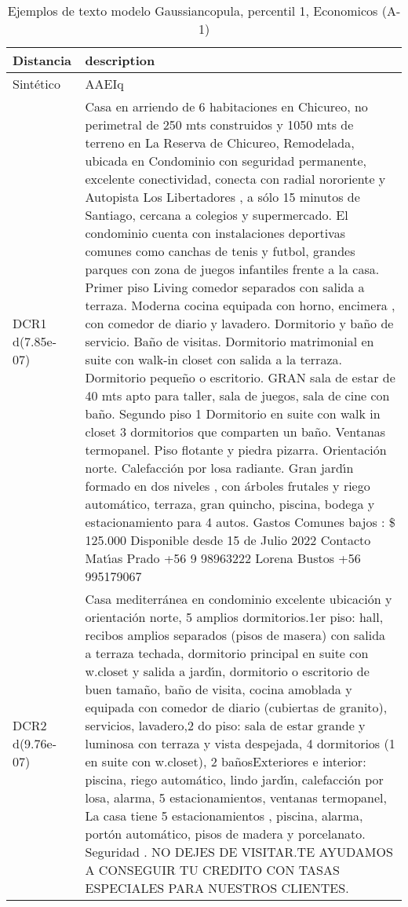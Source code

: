 \begin{table}[H]
\centering
\fontsize{10}{14}\selectfont
\caption{Ejemplos de texto modelo Gaussiancopula, percentil 1, Economicos (A-1)}
\label{table-example-economicos-a-1-gaussiancopula-1p-text}
\begin{tabular}{|l|m{35em}|}
\hline
\rowcolor[gray]{0.8}
Distancia & description \\
\hline Sintético & AAEIq \\
\hline DCR1 d(7.85e-07) & Casa en arriendo de 6 habitaciones en Chicureo, no perimetral de 250 mts construidos y 1050 mts de terreno en La Reserva de Chicureo, Remodelada, ubicada en Condominio con seguridad permanente, excelente conectividad, conecta con radial nororiente y Autopista Los Libertadores , a s\'olo 15 minutos de Santiago, cercana a colegios y supermercado. El condominio cuenta con instalaciones deportivas comunes como canchas de tenis y futbol, grandes parques con zona de juegos infantiles frente a la casa.
  Primer piso Living comedor separados con salida a terraza. Moderna cocina equipada con horno, encimera , con comedor de diario y lavadero. Dormitorio y ba\~no de servicio. Ba\~no de visitas. Dormitorio matrimonial en suite con walk-in closet con salida a la terraza. Dormitorio peque\~no o escritorio. GRAN sala de estar de 40 mts apto para taller, sala de juegos, sala de cine con ba\~no.  Segundo piso 1 Dormitorio en suite con walk  in closet 3 dormitorios que comparten un ba\~no.  Ventanas termopanel. Piso flotante y piedra pizarra. Orientaci\'on norte. Calefacci\'on por losa radiante. Gran jard{\'\i}n formado en dos niveles , con \'arboles frutales y riego autom\'atico, terraza, gran quincho, piscina, bodega y estacionamiento para 4 autos. Gastos Comunes bajos : \$ 125.000 Disponible desde 15 de Julio 2022 Contacto  Mat{\'\i}as Prado +56 9 98963222 Lorena Bustos +56 995179067 \\
\hline DCR2 d(9.76e-07) & Casa mediterr\'anea en condominio excelente ubicaci\'on y orientaci\'on norte, 5 amplios dormitorios.1er piso: hall, recibos amplios separados (pisos de masera) con salida a terraza techada, dormitorio principal en suite con w.closet y salida a jard{\'\i}n, dormitorio o escritorio de buen tama\~no, ba\~no de visita, cocina amoblada y equipada con comedor de diario (cubiertas de granito), servicios, lavadero,2 do piso: sala de estar grande y luminosa con terraza y vista despejada, 4 dormitorios (1 en suite con w.closet), 2 ba\~nosExteriores e interior: piscina, riego autom\'atico, lindo jard{\'\i}n, calefacci\'on por losa, alarma, 5 estacionamientos, ventanas termopanel, La casa tiene 5 estacionamientos , piscina, alarma, port\'on autom\'atico, pisos de madera y porcelanato. Seguridad . NO DEJES DE VISITAR.TE AYUDAMOS A CONSEGUIR TU CREDITO CON TASAS ESPECIALES PARA NUESTROS CLIENTES. \\
\hline
\end{tabular}
\end{table}
